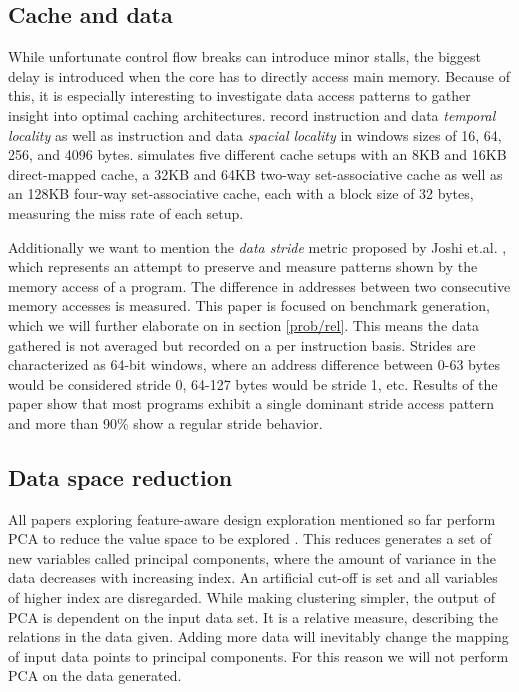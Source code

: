 \documentclass[../bachelor_paper.tex]{subfiles}
\begin{document}
\subsection{Cache and data}
While unfortunate control flow breaks can introduce minor stalls, the biggest delay is introduced when the core has to directly access main memory. Because of this, it is especially interesting to investigate data access patterns to gather insight into optimal caching architectures. \cite{phansalkarMeasuringProgramSimilarity2005,joshiMeasuringBenchmarkSimilarity2006} record instruction and data \emph{temporal locality} as well as instruction and data \emph{spacial locality} in windows sizes of 16, 64, 256, and 4096 bytes. \cite{eeckhoutQuantifyingImpactInput} simulates five different cache setups with an 8KB and 16KB direct-mapped cache, a 32KB and 64KB two-way set-associative cache as well as an 128KB four-way set-associative cache, each with a block size of 32 bytes, measuring the miss rate of each setup.

Additionally we want to mention the \emph{data stride} metric proposed by Joshi et.al. \cite{joshiDistillingEssenceProprietary2008}, which represents an attempt to preserve and measure patterns shown by the memory access of a program. The difference in addresses between two consecutive memory accesses is measured. This paper is focused on benchmark generation, which we will further elaborate on in section \ref{prob/rel}. This means the data gathered is not averaged but recorded on a per instruction basis. Strides are characterized as 64-bit windows, where an address difference between 0-63 bytes would be considered stride 0, 64-127 bytes would be stride 1, etc. Results of the paper show that most programs exhibit a single dominant stride access pattern and more than 90\% show a regular stride behavior.

\subsection{Data space reduction}
All papers exploring feature-aware design exploration mentioned so far perform \acl{PCA} to reduce the value space to be explored \cite{phansalkarMeasuringProgramSimilarity2005,joshiMeasuringBenchmarkSimilarity2006,eeckhoutQuantifyingImpactInput}. This reduces generates a set of new variables called principal components, where the amount of variance in the data decreases with increasing index. An artificial cut-off is set and all variables of higher index are disregarded. While making clustering simpler, the output of \ac{PCA} is dependent on the input data set. It is a relative measure, describing the relations in the data given. Adding more data will inevitably change the mapping of input data points to principal components. For this reason we will not perform \ac{PCA} on the data generated.
\end{document}
